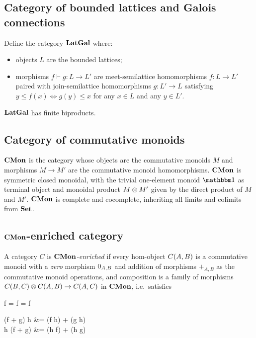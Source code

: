 
\subsection{Category of bounded lattices and Galois connections}

Define the category $\mathbf{LatGal}$ where:
\begin{itemize}
\item objects $L$ are the bounded lattices;
\item morphisms $f \vdash g: L \to L'$ are meet-semilattice homomorphisms $f: L \to L'$ paired with
join-semilattice homomorphisms $g: L' \to L$ satisfying $y \leq f(x) \iff g(y) \leq x$ for any $x \in L$ and any
$y \in L'$.
\end{itemize}

\noindent $\mathbf{LatGal}$ has finite biproducts. 

\subsection{Category of commutative monoids}

$\mathbf{CMon}$ is the category whose objects are the commutative monoids $M$ and morphisms $M \to M'$ are the
commutative monoid homomorphisms. $\mathbf{CMon}$ is symmetric closed monoidal, with the trivial one-element monoid
$\One$ as terminal object and monoidal product $M \otimes M'$ given by the direct product of $M$ and $M'$.
$\mathbf{CMon}$ is complete and cocomplete, inheriting all limits and colimits from $\mathbf{Set}$.

\subsection{$\mathbf{CMon}$-enriched category}

A category $C$ is \emph{$\mathbf{CMon}$-enriched} if every hom-object ${C}(A,B)$ is a commutative monoid with a
\emph{zero} morphism $0_{A,B}$ and addition of morphisms $+_{A,B}$ as the commutative monoid operations,
and composition is a family of morphisms ${C}(B,C) \otimes {C}(A,B) \to {C}(A,C)$ in $\mathbf{CMon}$,
i.e.~satisfies

\begin{salign*}
f \comp \zero = f = \zero \comp f
\end{salign*}
\begin{salign*}
(f + g) \comp h &= (f \comp h) + (g \comp h) \\
h \comp (f + g) &= (h \comp f) + (h \comp g)
\end{salign*}

